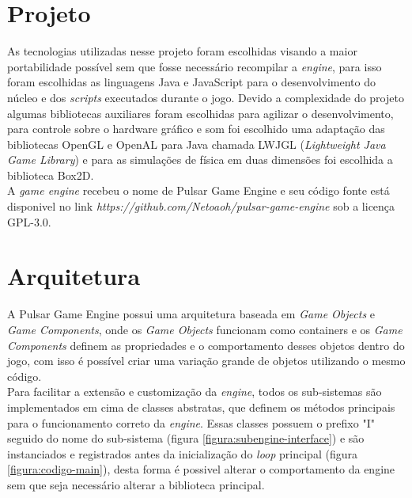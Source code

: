 \documentclass[12pt,	openright, twoside,	a4paper, english, french, spanish, brazil]{abntex2}
\begin{document}
%
%

\section{Projeto}

As tecnologias utilizadas nesse projeto foram escolhidas visando a maior portabilidade possível sem que fosse necessário recompilar a \textit{engine}, para isso foram escolhidas as linguagens Java e JavaScript para o desenvolvimento do núcleo e dos \textit{scripts} executados durante o jogo. Devido a complexidade do projeto algumas bibliotecas auxiliares foram escolhidas para agilizar o desenvolvimento, para controle sobre o hardware gráfico e som foi escolhido uma adaptação das bibliotecas OpenGL e OpenAL para Java chamada LWJGL (\textit{Lightweight Java Game Library}) e para as simulações de física em duas dimensões foi escolhida a biblioteca Box2D. \\
A \textit{game engine} recebeu o nome de Pulsar Game Engine e seu código fonte está disponivel no link \textit{https://github.com/Netoaoh/pulsar-game-engine} sob a licença GPL-3.0.

%
%

\section{Arquitetura}

A Pulsar Game Engine possui uma arquitetura baseada em \textit{Game Objects} e \textit{Game Components}, onde os \textit{Game Objects} funcionam como containers e os \textit{Game Components} definem as propriedades e o comportamento desses objetos dentro do jogo, com isso é possível criar uma variação grande de objetos utilizando o mesmo código. \\
Para facilitar a extensão e customização da \textit{engine}, todos os sub-sistemas são implementados em cima de classes abstratas, que definem os métodos principais para o funcionamento correto da \textit{engine}. Essas classes possuem o prefixo "I" seguido do nome do sub-sistema (figura \ref{figura:subengine-interface}) e são instanciados e registrados antes da inicialização do \textit{loop} principal (figura \ref{figura:codigo-main}), desta forma é possivel alterar o comportamento da engine sem que seja necessário alterar a biblioteca principal.
\end{document}
